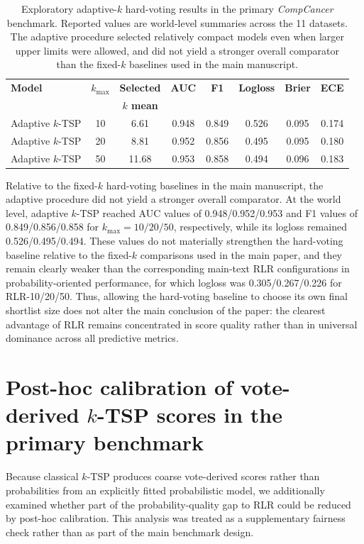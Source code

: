 \documentclass[11pt, a4paper]{article}
\newcommand{\stdtablefont}{\small}
\newcommand{\stdtablelayout}{%
  \stdtablefont
  \setlength{\tabcolsep}{4pt}
  \renewcommand{\arraystretch}{1.2}
}
\begin{document}
\begin{table}[!htbp]
\centering
\caption{Exploratory adaptive-$k$ hard-voting results in the primary \emph{CompCancer} benchmark. Reported values are world-level summaries across the 11 datasets. The adaptive procedure selected relatively compact models even when larger upper limits were allowed, and did not yield a stronger overall comparator than the fixed-$k$ baselines used in the main manuscript.}
\label{tab:adaptive_ktsp_world}
{\stdtablelayout
\begin{tabular}{lccccccc}
\toprule
\textbf{Model} & \textbf{$k_{\max}$} & \textbf{Selected} & \textbf{AUC} & \textbf{F1} & \textbf{Logloss} & \textbf{Brier} & \textbf{ECE} \\
 & & \textbf{$k$ mean} & & & & & \\
\midrule
Adaptive $k$-TSP & 10 & 6.61  & 0.948 & 0.849 & 0.526 & 0.095 & 0.174 \\
Adaptive $k$-TSP & 20 & 8.81  & 0.952 & 0.856 & 0.495 & 0.095 & 0.180 \\
Adaptive $k$-TSP & 50 & 11.68 & 0.953 & 0.858 & 0.494 & 0.096 & 0.183 \\
\bottomrule
\end{tabular}
}
\end{table}

Relative to the fixed-$k$ hard-voting baselines in the main manuscript, the adaptive procedure did not yield a stronger overall comparator. At the world level, adaptive $k$-TSP reached AUC values of 0.948/0.952/0.953 and F1 values of 0.849/0.856/0.858 for $k_{\max}=10/20/50$, respectively, while its logloss remained 0.526/0.495/0.494. These values do not materially strengthen the hard-voting baseline relative to the fixed-$k$ comparisons used in the main paper, and they remain clearly weaker than the corresponding main-text RLR configurations in probability-oriented performance, for which logloss was 0.305/0.267/0.226 for RLR-10/20/50. Thus, allowing the hard-voting baseline to choose its own final shortlist size does not alter the main conclusion of the paper: the clearest advantage of RLR remains concentrated in score quality rather than in universal dominance across all predictive metrics.


\section{Post-hoc calibration of vote-derived $k$-TSP scores in the primary benchmark}

Because classical $k$-TSP produces coarse vote-derived scores rather than probabilities from an explicitly fitted probabilistic model, we additionally examined whether part of the probability-quality gap to RLR could be reduced by post-hoc calibration. This analysis was treated as a supplementary fairness check rather than as part of the main benchmark design.
\end{document}
